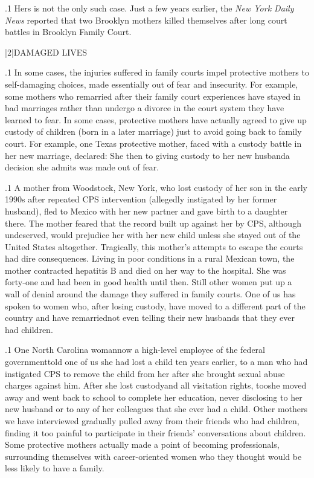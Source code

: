 \documentclass[11pt, twoside]{article}
\begin{document}
{\p.1{%
Hers is not the only such case. Just a few years earlier, the \textit{New York
Daily News} reported that two Brooklyn mothers killed themselves after
long court battles in Brooklyn Family Court.
}%


\s|2|{DAMAGED LIVES}

\p.1{%
\noindent{}In some cases, the injuries suffered in family courts impel protective
mothers to self-damaging choices, made essentially out of fear and insecurity. For example, some mothers who remarried after their family
court experiences have stayed in bad marriages rather than undergo a
divorce in the court system they have learned to fear. In some cases,
protective mothers have actually agreed to give up custody of children
(born in a later marriage) just to avoid going back to family court.
For example, one Texas protective mother, faced with a custody battle
in her new marriage, declared:  She then  to
giving custody to her new husband\mdash{}a decision she admits was made
out of fear.
}%

\p.1{%
A mother from Woodstock, New York, who lost custody of her son in
the early 1990s after repeated CPS
intervention (allegedly instigated by her former husband), fled to Mexico with her
new partner and gave birth to a daughter there. The mother feared that
the record built up against her by CPS, although undeserved, would prejudice her with her new child unless she stayed out of the United States
altogether. Tragically, this mother’s attempts to escape the courts had
dire consequences. Living in poor conditions in a rural Mexican town,
the mother contracted hepatitis B and died on her way to the hospital.
She was forty-one and had been in good health until then.
Still other women put up a wall of denial around the damage they
suffered in family courts. One of us has spoken to women who, after losing custody, have moved to a different part of the country and
have remarried\mdash{}not even telling their new husbands that they ever had
children.
}%

\p.1{%
One North Carolina woman\mdash{}now a high-level employee of the federal government\mdash{}told one of us she had lost a child ten years earlier,
to a man who had instigated CPS to remove the child from her after she
brought sexual abuse charges against him. After she lost custody\mdash{}and
all visitation rights, too\mdash{}she moved away and went back to school to
complete her education, never disclosing to her new husband or to any
of her colleagues that she ever had a child.
Other mothers we have interviewed gradually pulled away from their
friends who had children, finding it too painful to participate in their
friends’ conversations about children. Some protective mothers actually
made a point of becoming professionals, surrounding themselves with
career-oriented women who they thought would be less likely to have a
family.
}%


}
\end{document}
